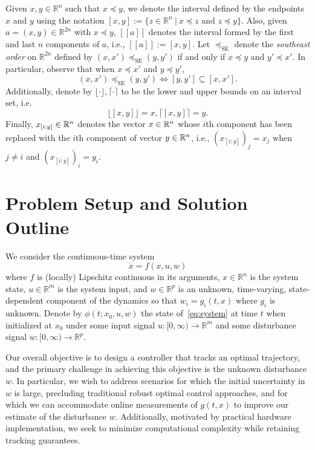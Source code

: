 \documentclass{IEEEojcsys}
\newcommand{\ul}{\underline}
\newcommand{\ol}{\overline}
\begin{document}
Given $x,y \in \mathbb{R}^n$ such that $x\preceq y$, we denote the interval defined by the endpoints $x$ and $y$ using the notation
 $   [x, y]:=\{z\in\mathbb{R}^n\ |\ x\preceq z\text{ and }z\preceq y\}.
 $ 
Also, given $a = (x, y)\in\mathbb{R}^{2n}$ with $x\preceq y$, $[\![a]\!]$ denotes the interval formed by the first and last $n$ components of $a$, i.e., $[\![a]\!] := [x, y]$. Let $\preceq_\text{SE}$ denote the \textit{southeast order} on $\mathbb{R}^{2n}$ defined by $(x, x')\preceq_\text{SE}(y, y')$ if and only if $x\preceq y \text{ and } y'\preceq x'$. In particular, observe that when $x\preceq x'$ and $y\preceq y'$, 
\begin{equation}
\label{eq:box}
    (x, x')\preceq_\text{SE}(y, y') \iff [y, y']\subseteq[x, x'].
\end{equation}
Additionally, denote by $\lfloor\cdot\rfloor, \lceil\cdot\rceil$ to be the lower and upper bounds on an interval set, i.e.
\begin{equation}
    \lfloor[x, y]\rfloor = x, \lceil[x, y]\rceil = y.
\end{equation}
Finally, $x_{[i:y]} \in\mathbb{R}^n$ denotes the vector $x\in\mathbb{R}^n$ whose $i$th component has been replaced with the $i$th component of vector $y\in\mathbb{R}^n$, i.e., $(x_{[i:y]})_j = x_j$ when $j\neq i$ and $(x_{[i:y]})_i = y_i$.

\section{Problem Setup and Solution Outline}
\label{section:problem}
We consider the continuous-time system
\begin{equation}
    \dot{x} = f(x, u, w)
    \label{eq:system}
\end{equation}
where $f$ is (locally) Lipschitz continuous in its arguments,  $x \in \mathbb{R}^n$ is the system state, 
$u \in \mathbb{R}^m$ 
is the system input,
and $w \in \mathbb{R}^p$ is an unknown, time-varying, state-dependent component of the dynamics so that $w_i=g_i(t, x)$ where $g_i$ is unknown.  Denote by $\phi(t; x_0, u, w)$ the state of~\eqref{eq:system} at time $t$ when initialized at $x_0$ under some input signal $u:[0,\infty)\to\mathbb{R}^m$ and some disturbance signal $w:[0,\infty)\to\mathbb{R}^p$.



Our overall objective is to design a controller that tracks an optimal trajectory, and the primary challenge in achieving this objective is the unknown disturbance $w$. In particular, we wish to address scenarios for which the initial uncertainty in $w$ is large, precluding traditional robust optimal control approaches, and for which we can accommodate online measurements of $g(t,x)$ to improve our estimate of the disturbance $w$. Additionally, motivated by practical hardware implementation, we seek to minimize computational complexity while retaining tracking guarantees.
\end{document}
